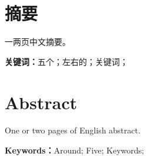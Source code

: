 \section*{\bfseries\heiti{}摘\hspace*{2\ccwd}要}

\songti{}
\indent 
一两页中文摘要。

\vspace{1cm} 
{\bfseries\songti 关键词：}五个；左右的；关键词；

\pagebreak

\section*{\bfseries\rmfamily{}Abstract}

\rmfamily{}
\indent 
One or two pages of English abstract.

\vspace{1cm} 
{\bfseries\rmfamily Keywords：}Around; Five; Keywords;

\pagebreak